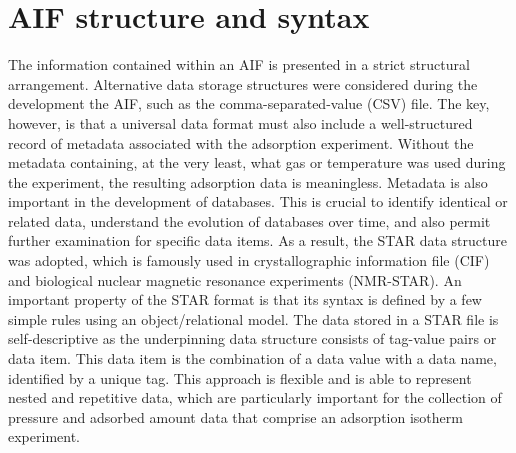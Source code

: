 \documentclass[journal=langd5,manuscript=article]{achemso}
\begin{document}
\section{AIF structure and syntax}
The information contained within an AIF is presented in a strict structural arrangement.
Alternative data storage structures were considered during the development the AIF, such as the comma-separated-value (CSV) file.
The key, however, is that a universal data format must also include a well-structured record of metadata associated with the adsorption experiment.
Without the metadata containing, at the very least, what gas or temperature was used during the experiment, the resulting adsorption data is meaningless.
Metadata is also important in the development of databases.
This is crucial to identify identical or related data, understand the evolution of databases over time, and also permit further examination for specific data items.
As a result, the STAR data structure was adopted,\cite{10.1021/ci00019a005} which is famously used in crystallographic information file (CIF) and biological nuclear magnetic resonance experiments (NMR-STAR).\cite{10.1107/S010876739101067X,10.1007/s10858-018-0220-3}
An important property of the STAR format is that its syntax is defined by a few simple rules using an object/relational model.
The data stored in a STAR file is self-descriptive as the underpinning data structure consists of tag-value pairs or data item.
This data item is the combination of a data value with a data name, identified by a unique tag.
This approach is flexible and is able to represent nested and repetitive data, which are particularly important for the collection of pressure and adsorbed amount data that comprise an adsorption isotherm experiment.
\end{document}
